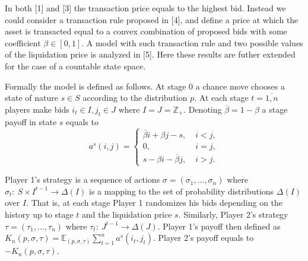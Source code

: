 In both [1] and [3] the transaction price equals to the highest bid. Instead we
could consider a transaction rule proposed in [4], and define a price at which
the asset is transacted equal to a convex combination of proposed bids with some
coefficient $\beta \in [0, 1]$. A model with such transaction rule and two
possible values of the liquidation price is analyzed in [5]. Here these results
are futher extended for the case of a countable state space.

Formally the model is defined as follows. At stage 0 a chance move chooses a
state of nature $s \in S$ according to the distribution $p$. At each stage $t =
\overline{1,n}$ players make bids $i_t \in I, j_t \in J$ where $I = J =
\mathbb{Z}_+$. Denoting $\overline{\beta} = 1-\beta$ a stage payoff in state $s$
equals to
\begin{equation*}
  a^s(i, j) =
  \begin{cases}
    \overline{\beta} i + \beta j - s, &\; i < j,\\
    0, &\; i = j,\\
    s - \beta i - \overline{\beta} j, &\; i > j.
  \end{cases}
\end{equation*}

Player 1's strategy is a sequence of actions $\sigma = (\sigma_1, \ldots,
\sigma_n)$ where $\sigma_t:~S \times I^{t-1} \rightarrow \Delta(I)$ is a mapping
to the set of probability distributions $\Delta(I)$ over $I$. That is, at each
stage Player 1 randomizes his bids depending on the history up to stage $t$ and
the liquidation price $s$. Similarly, Player 2's strategy $\tau = (\tau_1,
\ldots, \tau_n)$ where $\tau_t:~J^{t-1} \rightarrow \Delta(J)$. Player 1's
payoff then defined as $K_n(p, \sigma, \tau) = \mathbb{E}_{(p, \sigma, \tau)}
\sum_{t=1}^n a^s(i_t,j_t)$. Player 2's payoff equals to $-K_n(p, \sigma, \tau)$.

